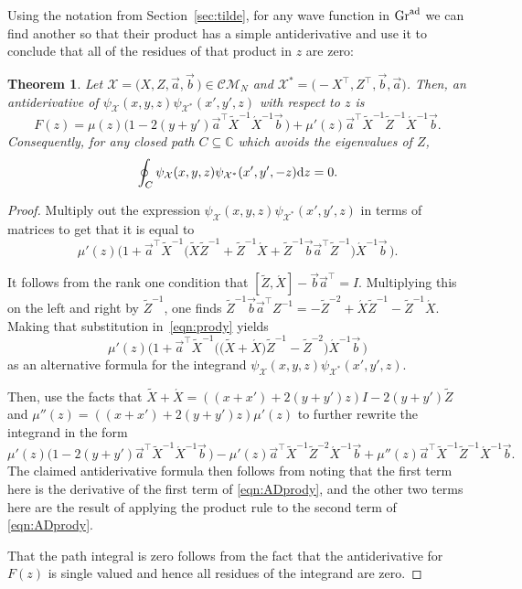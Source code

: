 \documentclass[10pt,a4paper]{amsart}
\numberwithin{equation}{section}
\newtheorem{Theorem}{Theorem}[section]
\theoremstyle{definition}
\def\X{\mathcal{X}}
\def\CM{\mathcal{C\!M}}
\begin{document}
Using the notation from Section~\ref{sec:tilde}, for any wave function
in ${\rm Gr}^{\rm ad}$ we can find another
so that their product has a simple antiderivative
and use it to conclude that all of the residues of that product in $z$
are zero:
\begin{Theorem}\label{thm:zint}
Let $\X=\bigl(X,Z,\vec a,\vec b\,\bigr)\in \CM_N$ and $\X^*=\bigl(-X^{\top},Z^{\top},\vec
b,\vec a\bigr)$.
Then, an antiderivative of $\psi_{\X}(x,y,z)\psi_{\X^*}(x',y',z)$
with respect to $z$ is
 \begin{equation}
F(z)=\mu(z)
\bigl(1-2(y+y')\vec a^{\top}\tilde X^{-1}\acute X^{-1}\vec
b\,\bigr)
+\mu'(z)
\vec a^{\top}\tilde X^{-1}\tilde Z^{-1}
\acute X^{-1}\vec b.
 \label{eqn:ADprody}
 \end{equation}
Consequently, for
any closed path $C\subseteq \mathbb{C}$ which avoids the eigenvalues
of $Z$,
\begin{equation}
 \oint_C \psi_{\X}(x,y,z)\psi_{\X^*}(x',y',-z){\rm d}z=0.
 \label{eqn:zintegralRES}
\end{equation}
 \end{Theorem}

\begin{proof}
Multiply out
the expression $\psi_{\X}(x,y,z)\psi_{\X^*}(x',y',z)$ in terms of matrices to get that it is equal to
\begin{equation}
\mu'(z)\bigl(1+\vec a^{\top}\tilde
 X^{-1}\bigl(\tilde X\tilde Z^{-1}+\tilde Z^{-1}\acute X
 +\tilde Z^{-1}\vec b\vec
 a^{\top}\tilde Z^{-1}\bigr)\acute X^{-1}\vec b\,\bigr).\label{eqn:prody}
\end{equation}

It follows from the rank one condition that $[\tilde Z,\acute X]-\vec
b\vec a^{\top}=I$. Multiplying this on the left and right by $\tilde
Z^{-1}$, one finds $\tilde Z^{-1}\vec b\vec a^{\top}Z^{-1}=-\tilde
Z^{-2}+\acute X\tilde Z^{-1}-\tilde Z^{-1}\acute X$. Making that
substitution in~\eqref{eqn:prody} yields
\[
 \mu'(z)\bigl(
 1+\vec a^{\top} \tilde X^{-1}\bigl(\bigl(\tilde X+\acute X\bigr)\tilde
 Z^{-1}-\tilde Z^{-2}\bigr)\acute X^{-1}\vec b\,\bigr)
\]
as an alternative formula for the integrand
$\psi_{\X}(x,y,z)\psi_{\X^*}(x',y',z)$.

Then, use the facts that $\tilde X+\acute
X=((x+x')+2(y+y')z)I-2(y+y')\tilde Z$ and
$\mu''(z)=((x+x')+2(y+y')z)\mu'(z)$ to further rewrite the integrand
in the form
\[
\mu'(z)\bigl(1-2(y+y')\vec a^{\top}\tilde X^{-1}\acute X^{-1}\vec b\,\bigr)
-
\mu'(z)\vec a^{\top}\tilde X^{-1}\tilde Z^{-2}\acute X^{-1}\vec b
+\mu''(z)\vec a^{\top}\tilde X^{-1}\tilde Z^{-1}\acute X^{-1}\vec b.
\]
The claimed antiderivative formula then follows from noting that the first term here is the derivative of the first term of \eqref{eqn:ADprody},
and the other two terms here are the result of applying the product
rule to the second term of \eqref{eqn:ADprody}.

That the path integral is zero follows from the fact that the antiderivative
for $F(z)$ is single valued and hence all residues of the integrand are zero.\end{proof}
\end{document}
